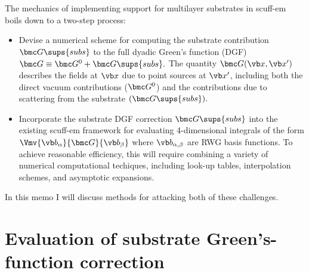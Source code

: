 \documentclass[letterpaper]{article}
\begin{document}
The mechanics of implementing support for multilayer substrates
in {\sc scuff-em} boils down to a two-step process:
\begin{itemize}
 \item Devise a numerical scheme for computing the
       substrate contribution $\bmc G\sups{subs}$
       to the full dyadic Green's function (DGF)
       $\bmc G\equiv \bmc G^0 + \bmc G\sups{subs}.$
       The quantity $\bmc G(\vb x, \vb x^\prime)$
       describes the fields at $\vb x$ due to
       point sources at $\vb x^\prime$, including
       both the direct vacuum contributions ($\bmc G^0$)
       and the contributions due to scattering from the
       substrate $(\bmc G\sups{subs}).$
 \item Incorporate the substrate DGF correction $\bmc G\sups{subs}$ into
       the existing {\sc scuff-em} framework for
       evaluating 4-dimensional integrals of the form
       $\Vmv{\vb b_\alpha}{\bmc G}{\vb b_\beta}$
       where $\vb b_{\alpha,\beta}$ are RWG basis functions.
       To achieve reasonable efficiency, this will require
       combining a variety of numerical computational 
       techiques, including look-up tables, interpolation schemes,
       and asymptotic expansions.
\end{itemize}

In this memo I will discuss methods for attacking
both of these challenges.

\newpage
\section{Evaluation of substrate Green's-function correction}
\end{document}
